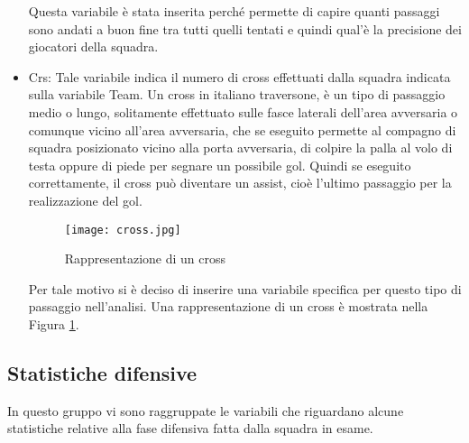 \begin{itemize}
	Questa variabile è stata inserita perché permette di capire quanti passaggi sono andati a buon fine tra tutti quelli tentati e quindi qual'è la precisione dei giocatori della squadra.
	
	\item \textsf{Crs}: Tale variabile indica il numero di cross effettuati dalla squadra indicata sulla variabile \textsf{Team}. Un cross in italiano traversone, è un tipo di passaggio medio o lungo, solitamente effettuato sulle fasce laterali dell'area avversaria o comunque vicino all'area avversaria, che se eseguito permette al compagno di squadra posizionato vicino alla porta avversaria, di colpire la palla al volo di testa oppure di piede per segnare un possibile gol. Quindi se eseguito correttamente, il cross può diventare un assist, cioè l'ultimo passaggio per la realizzazione del gol. 
	
	\begin{figure}[!ht]
		\begin{center}
			\texttt{[image: cross.jpg]}
			\caption{Rappresentazione di un cross} \label{fig:cross}
		\end{center}
	\end{figure}
	
	Per tale motivo si è deciso di inserire una variabile specifica per questo tipo di passaggio nell'analisi. Una rappresentazione di un cross è mostrata nella Figura \ref{fig:cross}.
\end{itemize}

\subsection{Statistiche difensive}

In questo gruppo vi sono raggruppate le variabili che riguardano alcune statistiche relative alla fase difensiva fatta dalla squadra in esame.

